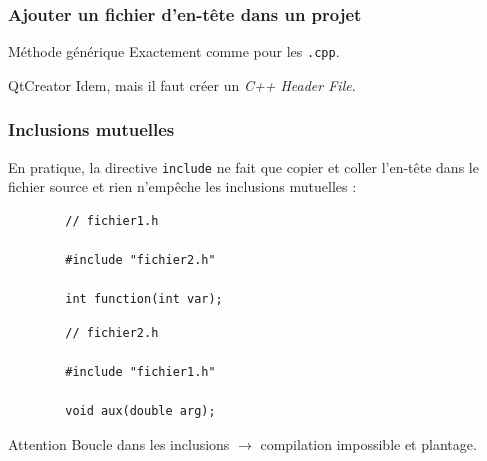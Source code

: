 \begin{frame}
\frametitle{Ajouter un fichier d'en-tête dans un projet}

\begin{block}{Méthode générique}
    Exactement comme pour les \texttt{.cpp}.
\end{block}

\begin{block}{QtCreator}
    Idem, mais il faut créer un \textit{C++ Header File}.
\end{block}

\end{frame}

\begin{frame}[fragile=singleslide]
\frametitle{Inclusions mutuelles}

En pratique, la directive \texttt{include} ne fait que copier et coller l'en-tête dans le fichier source et rien n'empêche les inclusions mutuelles :

\begin{minipage}{0.47\linewidth}
    \begin{verbatim}
        // fichier1.h
        
        #include "fichier2.h"
        
        int function(int var);
    \end{verbatim}
\end{minipage}
\begin{minipage}{0.47\linewidth}
    \begin{verbatim}
        // fichier2.h
        
        #include "fichier1.h"
        
        void aux(double arg);
    \end{verbatim}
\end{minipage}

    \begin{alertblock}{Attention}
        Boucle dans les inclusions $\rightarrow$ compilation impossible et plantage.
    \end{alertblock}
\end{frame}

